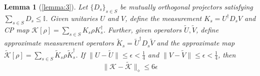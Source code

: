 \documentclass[aps,floatfix,10pt,amssymb,amsfont,amsmath,superscriptaddress,float,nofootinbib,longbibliography,nobalancelastpage,twocolumn]{revtex4-2}
\newtheorem*{lemma*}{Lemma}
\begin{document}
\begin{lemma*}[\ref{lemma:3}]
Let $\{D_s\}_{s\in S}$ be mutually orthogonal projectors satisfying $\sum_{s\in S} D_s \leq \mathbb{I}$. Given unitaries $U$ and $V$, define the measurement $K_s = U^{\dagger}D_s V$ and CP map $\mathcal{K}[\rho] = \sum_{s \in S} K_s\rho K_s^{\dagger}$. Further, given operators $\tilde U, \tilde V$, define approximate measurement operators $\tilde K_s = \tilde U^{\dagger}D_s \tilde V$ and the approximate map $\tilde{\mathcal{K}}[\rho] = \sum_{s \in S} \tilde K_s\rho \tilde K_s^{\dagger}$. If $\|U-\tilde U\| \leq \epsilon<\frac14$ and $\|V-\tilde V\| \leq \epsilon<\frac14$, then 
\begin{equation}
    \|\mathcal{K} - \tilde{\mathcal{K}}\|_{\diamond} \leq 6\epsilon
\end{equation}
\end{lemma*}
\end{document}
